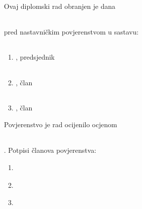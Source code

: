 %
\thispagestyle{empty}
%
Ovaj diplomski rad obranjen je dana
\begin{tabular}{p{5.0 cm}}
\\
\hline
\end{tabular}
pred nastavni\v{c}kim povjerenstvom
u sastavu:
%
\vskip 30pt
\begin{enumerate}
\item{
\begin{tabular}{p{7.0 cm}}

\\
\hline
\end{tabular}
, predsjednik
}
\vskip 20pt
\item{
\begin{tabular}{p{7.0 cm}}
\\
\hline
\end{tabular}
, \v{c}lan
}
\vskip 20pt
\item{
\begin{tabular}{p{7.0 cm}}
\\
\hline
\end{tabular}
, \v{c}lan
}
\end{enumerate}
\vskip 25pt
%
Povjerenstvo je rad ocijenilo ocjenom
\begin{tabular}{p{5.0 cm}}
\\
\hline
\end{tabular}.
\vskip 25pt
%
Potpisi \v{c}lanova povjerenstva:
\vskip 30pt
%
\begin{enumerate}
\item{
\begin{tabular}{p{7.0 cm}}
\\
\hline
\end{tabular}
} %
\vskip 30pt
\item{
\begin{tabular}{p{7.0 cm}}
\\
\hline
\end{tabular}
} %
\vskip 30pt
\item{
\begin{tabular}{p{7.0 cm}}
\\
\hline
\end{tabular}
} %
\end{enumerate}

